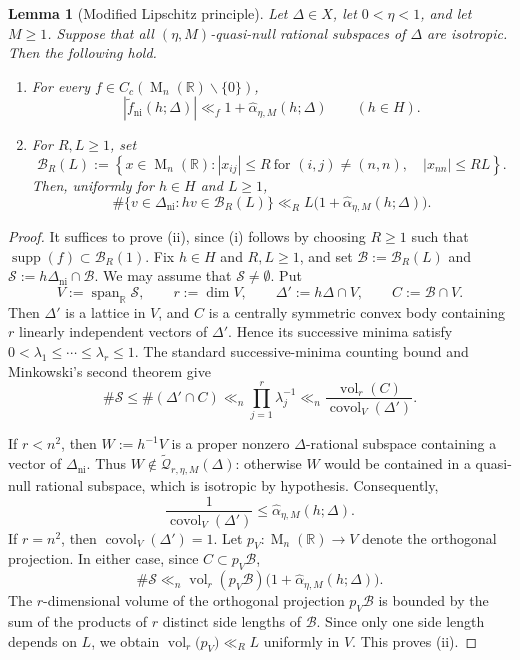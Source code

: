 \documentclass[reqno,11pt]{amsart}
\numberwithin{equation}{section}
\newtheorem{lemma}[theorem]{Lemma}
\theoremstyle{definition}
\theoremstyle{remark}
\newcommand{\op}{\operatorname}
\newcommand{\R}{\mathbb R}
\newcommand{\M}{\op{M}}
\begin{document}
\begin{lemma}[Modified Lipschitz principle]
\label{lem:modifiedlipschitz}
Let $\Delta\in X$, let $0<\eta<1$, and let $M\ge1$. Suppose that all
$(\eta,M)$-quasi-null rational subspaces of $\Delta$ are isotropic.
Then the following hold.

\begin{enumerate}[label=\textnormal{(\roman*)}]
\item For every $f\in C_c(\M_n(\R)\smallsetminus\{0\})$,
$$
|\widetilde f_{\operatorname{ni}}(h;\Delta)|
\ll_f
1+\widehat\alpha_{\eta,M}(h;\Delta)
\qquad(h\in H).
$$

\item For $R,L\ge1$, set
\begin{equation}\label{brl}
\mathscr B_R(L)
:=
\left\{x\in\M_n(\R):
|x_{ij}|\le R\ \text{for }(i,j)\ne(n,n),\quad
|x_{nn}|\le RL
\right\}.
\end{equation}
Then, uniformly for $h\in H$ and $L\ge1$,
$$
\#\{v\in\Delta_{\operatorname{ni}}:hv\in\mathscr B_R(L)\}
\ll_R
L\bigl(1+\widehat\alpha_{\eta,M}(h;\Delta)\bigr).
$$
\end{enumerate}
\end{lemma}
\begin{proof}
It suffices to prove \textnormal{(ii)}, since \textnormal{(i)} follows
by choosing $R\ge1$ such that
$\operatorname{supp}(f)\subset\mathscr B_R(1)$.
Fix $h\in H$ and $R,L\ge1$, and set
$\mathscr B:=\mathscr B_R(L)$ and $
\mathscr S:=h\Delta_{\operatorname{ni}}\cap\mathscr B$.
We may assume that $\mathscr S\ne\emptyset$. Put
$$
V:=\operatorname{span}_{\mathbb R}\mathscr S,
\qquad
r:=\dim V,
\qquad
\Delta':=h\Delta\cap V,
\qquad
C:=\mathscr B\cap V.
$$
Then $\Delta'$ is a lattice in $V$, and $C$ is a centrally symmetric
convex body containing $r$ linearly independent vectors of $\Delta'$.
Hence its successive minima satisfy
$0<\lambda_1\le\cdots\le\lambda_r\le1$.
The standard successive-minima counting bound and Minkowski's second
theorem give
$$
\#\mathscr S
\le \#(\Delta'\cap C)
\ll_n \prod_{j=1}^r\lambda_j^{-1}
\ll_n
\frac{\operatorname{vol}_r(C)}
     {\operatorname{covol}_V(\Delta')}.
$$

If $r<n^2$, then $W:=h^{-1}V$ is a proper nonzero
$\Delta$-rational subspace containing a vector of
$\Delta_{\operatorname{ni}}$. Thus
$W\notin\widetilde{\mathscr Q}_{r,\eta,M}(\Delta)$:
otherwise $W$ would be contained in a quasi-null rational subspace,
which is isotropic by hypothesis. Consequently,
$$
\frac{1}{\operatorname{covol}_V(\Delta')}
\le \widehat\alpha_{\eta,M}(h;\Delta).
$$
If $r=n^2$, then $\operatorname{covol}_V(\Delta')=1$.
Let $p_V:\M_n(\mathbb R)\to V$ denote the orthogonal projection.
In either case, since $C\subset p_V\mathscr B$,
$$
\#\mathscr S
\ll_n
\operatorname{vol}_r(p_V\mathscr B)
\bigl(1+\widehat\alpha_{\eta,M}(h;\Delta)\bigr).
$$
The $r$-dimensional volume of the orthogonal projection
$p_V\mathscr B$ is bounded by the sum of the products of
$r$ distinct side lengths of $\mathscr B$.
Since only one side length depends on $L$, we obtain
$
\operatorname{vol}_r(p_V\mathscr)\ll_R L
$
uniformly in $V$. This proves \textnormal{(ii)}.
\end{proof}
\end{document}
